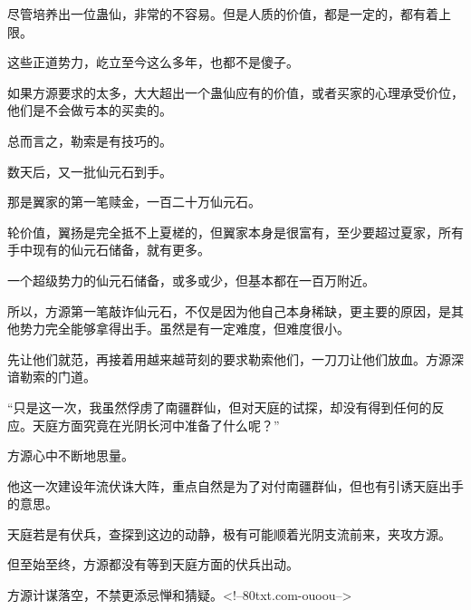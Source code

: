 \begin{this_body}
尽管培养出一位蛊仙，非常的不容易。但是人质的价值，都是一定的，都有着上限。

这些正道势力，屹立至今这么多年，也都不是傻子。

如果方源要求的太多，大大超出一个蛊仙应有的价值，或者买家的心理承受价位，他们是不会做亏本的买卖的。

总而言之，勒索是有技巧的。

数天后，又一批仙元石到手。

那是翼家的第一笔赎金，一百二十万仙元石。

轮价值，翼扬是完全抵不上夏槎的，但翼家本身是很富有，至少要超过夏家，所有手中现有的仙元石储备，就有更多。

一个超级势力的仙元石储备，或多或少，但基本都在一百万附近。

所以，方源第一笔敲诈仙元石，不仅是因为他自己本身稀缺，更主要的原因，是其他势力完全能够拿得出手。虽然是有一定难度，但难度很小。

先让他们就范，再接着用越来越苛刻的要求勒索他们，一刀刀让他们放血。方源深谙勒索的门道。

“只是这一次，我虽然俘虏了南疆群仙，但对天庭的试探，却没有得到任何的反应。天庭方面究竟在光阴长河中准备了什么呢？”

方源心中不断地思量。

他这一次建设年流伏诛大阵，重点自然是为了对付南疆群仙，但也有引诱天庭出手的意思。

天庭若是有伏兵，查探到这边的动静，极有可能顺着光阴支流前来，夹攻方源。

但至始至终，方源都没有等到天庭方面的伏兵出动。

方源计谋落空，不禁更添忌惮和猜疑。<!--80txt.com-ouoou-->

\end{this_body}

